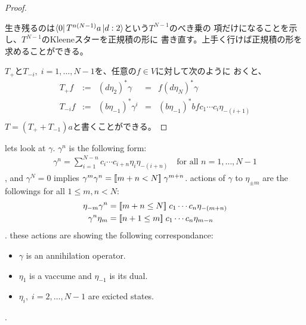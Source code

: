 {\begin{proof}
		\begin{todo}[この先]\label{todo:この先} %
			生き残るのは$\mathinner{\langle{0}|}T^{n(N-1)}a\mathinner{|{d:2}\rangle}$という$T^{N-1}$のべき乗の
			項だけになることを示し、$T^{N-1}$のKleeneスターを正規積の形に
			書き直す。上手く行けば正規積の形を求めることができる。
		\end{todo} %
		$T_+$と$T_{-i},\;i=1,\dots,N-1$を、任意の$f\in V$に対して次のように
		おくと、
		\begin{equation*}\begin{array}{rclcl}
			T_+f &:=& (d\eta_2)^*\gamma &=& f(d\eta_N)^*\gamma \\
			T_{-i}f &:=& (b\eta_{-1})^*\gamma^i 
				&=& (b\eta_{-1})^*bfc_1\cdots c_i\eta_{-(i+1)} \\
		\end{array}\end{equation*}
		$T=(T_++T_{-1})a$と書くことができる。
	\end{proof} %
	\begin{note}[memo]\label{note:memo} %
		lets look at $\gamma$. $\gamma^n$ is the following form:
		\begin{equation*}\begin{split}
			\gamma^n = \sum_{i=1}^{N-n} c_i\cdots c_{i+n} \eta_i\eta_{-(i+n)}
			\quad\text{for all } n=1,\dots,N-1
		\end{split}\end{equation*}
		, and $\gamma^N=0$ implies $\gamma^m\gamma^n=[\![m+n<N]\!]\;\gamma^{m+n}$.
		actions of $\gamma$ to $\eta_{\pm m}$ are the followings
		for all $1\le m,n< N$:
		\begin{equation*}\begin{split}
			\eta_{-m}\gamma^n &= [\![m+n\le N]\!]\; c_1\cdots c_n\eta_{-(m+n)} \\
			\gamma^n\eta_m &= [\![n+1\le m]\!]\; c_1\cdots c_n\eta_{m-n} \\
		\end{split}\end{equation*}
		. these actions are showing the following correspondance:
		\begin{itemize}\setlength{\itemsep}{-1mm} %
			\item $\gamma$ is an annihilation operator.
			\item $\eta_1$ is a vaccume and $\eta_{-1}$ is its dual.
			\item $\eta_i,\;i=2,\dots,N-1$ are exicted states.
		\end{itemize} %
		.
	\end{note} %
}\endgroup %
